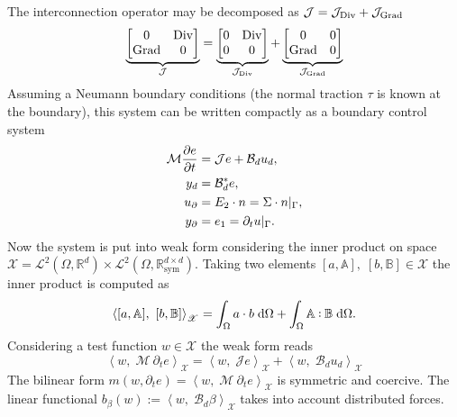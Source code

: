 The interconnection operator may be decomposed as $\mathcal{J} = \mathcal{J}_{\operatorname*{Div}} + \mathcal{J}_{\operatorname*{Grad}}$
\begin{equation}
\underbrace{\begin{bmatrix}
	0 & \operatorname*{Div} \\ \operatorname*{Grad} & 0 \\
	\end{bmatrix}}_{\mathcal{J}} = 
\underbrace{\begin{bmatrix}
	0 & \operatorname*{Div} \\ 0  & 0 \\
	\end{bmatrix}}_{\mathcal{J}_{\operatorname*{Div}}} + 
\underbrace{\begin{bmatrix}
	0 & 0 \\ \operatorname*{Grad} & 0 \\
	\end{bmatrix}}_{\mathcal{J}_{\operatorname*{Grad}}}
\end{equation}
Assuming a Neumann boundary conditions (the normal traction $\tau$ is known at the boundary),
this system can be written compactly as a boundary control system
\begin{equation}
\label{eq:eldyn_PDE}
\begin{aligned}
\mathcal{M} \diffp{e}{t} &= \mathcal{J} e + \mathcal{B}_d u_d, \\
y_d &= \mathcal{B}_d^* e, \\
u_\partial &= E_2 \cdot n = \Sigma \cdot n|_{\Gamma}, \\
y_\partial &= e_1 = \partial_t u|_{\Gamma}.
\end{aligned}
\end{equation}
Now the system is put into weak form considering the inner product on space $\mathscr{X} = \mathscr{L}^2(\Omega, \mathbb{R}^d) \times \mathscr{L}^2(\Omega, \mathbb{R}^{d\times d}_{\text{sym}})$. Taking two elements $[a, \mathbb{A}], \; [b, \mathbb{B}] \in \mathscr{X}$ the inner product is computed as
\[
\left\langle [a, \mathbb{A}], \ [b, \mathbb{B}] \right\rangle_{\mathscr{X}} = \int_{\Omega} a \cdot b \d{\Omega} + \int_{\Omega} \mathbb{A} \cddot \mathbb{B} \d{\Omega}.
\]
Considering a test function $w \in \mathscr{X}$ the weak form reads
\begin{equation*}
\left\langle w, \; \mathcal{M} \ \partial_t e \right\rangle_{\mathscr{X}} = \left\langle w, \; \mathcal{J} e \right\rangle_{\mathscr{X}} + \left\langle w, \; \mathcal{B}_d u_d \right\rangle_{\mathscr{X}}
\end{equation*}
The bilinear form $m(w, \partial_t e) = \left\langle w, \; \mathcal{M} \ \partial_t e \right\rangle_{\mathscr{X}}$ is symmetric and coercive. The linear functional $b_\beta(w):=\left\langle w, \; \mathcal{B}_d \beta \right\rangle_{\mathscr{X}}$ takes into account distributed forces.\\
